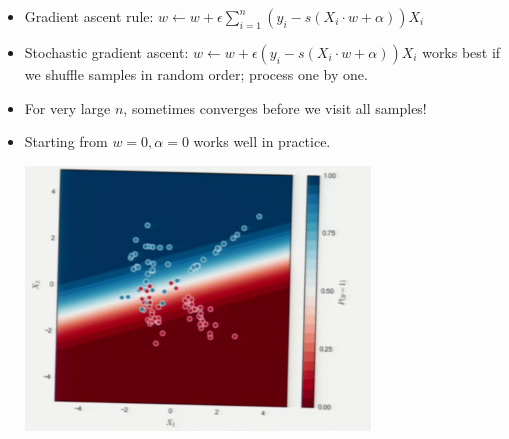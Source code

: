 \documentclass[10pt]{article}
\begin{document}
\begin{description}
\begin{itemize}
			\item Gradient ascent rule: $w \leftarrow w + \epsilon \sum_{i=1}^{n}(y_{i} - s(X_{i}\cdot w + \alpha))X_{i}$
			\item Stochastic gradient ascent: $w \leftarrow w + \epsilon(y_{i} - s(X_{i}\cdot w + \alpha))X_{i}$ works best if we shuffle samples in random order; process one by one.
			\item For very large $n$, sometimes converges before we visit all samples!
			\item Starting from $w=0, \alpha=0$ works well in practice.
			\begin{center}
				\includegraphics[scale=0.5]{images/regression}
			\end{center}
		\end{itemize}
\end{description}

\newpage
\end{document}

